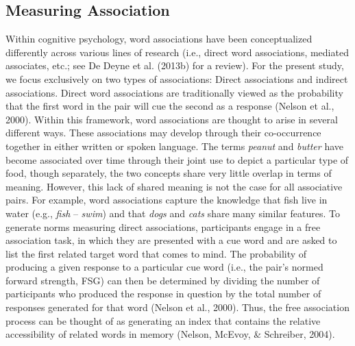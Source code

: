 \documentclass[english,,man]{apa6}
\begin{document}
\hypertarget{measuring-association}{%
\subsection{Measuring Association}\label{measuring-association}}

Within cognitive psychology, word associations have been conceptualized differently across various lines of research (i.e., direct word associations, mediated associates, etc.; see De Deyne et al. (2013b) for a review). For the present study, we focus exclusively on two types of associations: Direct associations and indirect associations. Direct word associations are traditionally viewed as the probability that the first word in the pair will cue the second as a response (Nelson et al., 2000). Within this framework, word associations are thought to arise in several different ways. These associations may develop through their co-occurrence together in either written or spoken language. The terms \emph{peanut} and \emph{butter} have become associated over time through their joint use to depict a particular type of food, though separately, the two concepts share very little overlap in terms of meaning. However, this lack of shared meaning is not the case for all associative pairs. For example, word associations capture the knowledge that fish live in water (e.g., \emph{fish} -- \emph{swim}) and that \emph{dogs} and \emph{cats} share many similar features. To generate norms measuring direct associations, participants engage in a free association task, in which they are presented with a cue word and are asked to list the first related target word that comes to mind. The probability of producing a given response to a particular cue word (i.e., the pair's normed forward strength, FSG) can then be determined by dividing the number of participants who produced the response in question by the total number of responses generated for that word (Nelson et al., 2000). Thus, the free association process can be thought of as generating an index that contains the relative accessibility of related words in memory (Nelson, McEvoy, \& Schreiber, 2004).
\end{document}
